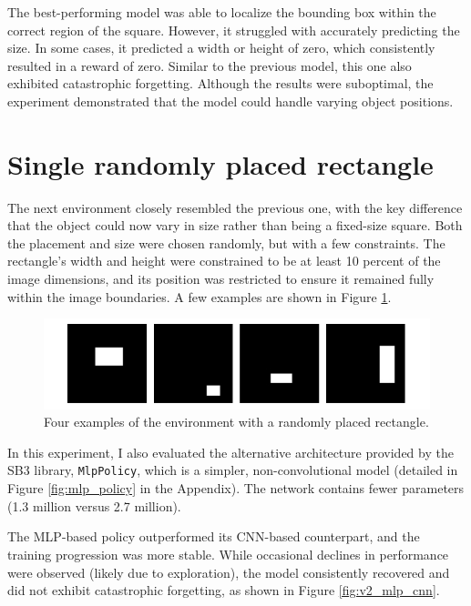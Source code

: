 \documentclass[
  digital,     %
  oneside,     %
  nosansbold,  %
  nocolorbold, %
  lof,         %
  lot,         %
]{fithesis4}
\begin{document}
The best-performing model was able to localize the bounding box within the correct region of the square. However, it struggled with accurately predicting the size. In some cases, it predicted a width or height of zero, which consistently resulted in a reward of zero. Similar to the previous model, this one also exhibited catastrophic forgetting. Although the results were suboptimal, the experiment demonstrated that the model could handle varying object positions.

\section{Single randomly placed rectangle}
\label{sec:moving_rectangle}
The next environment closely resembled the previous one, with the key difference that the object could now vary in size rather than being a fixed-size square. Both the placement and size were chosen randomly, but with a few constraints. The rectangle’s width and height were constrained to be at least 10 percent of the image dimensions, and its position was restricted to ensure it remained fully within the image boundaries. A few examples are shown in Figure \ref{fig:env2}.

\begin{figure}
    \includegraphics[width=1\linewidth]{env_examples/env2.pdf}
    \caption{Four examples of the environment with a randomly placed rectangle.}
    \label{fig:env2}
\end{figure}

In this experiment, I also evaluated the alternative architecture provided by the SB3 library, \texttt{MlpPolicy}, which is a simpler, non-convolutional model (detailed in Figure \ref{fig:mlp_policy} in the Appendix). The network contains fewer parameters (1.3 million versus 2.7 million).

The MLP-based policy outperformed its CNN-based counterpart, and the training progression was more stable. While occasional declines in performance were observed (likely due to exploration), the model consistently recovered and did not exhibit catastrophic forgetting, as shown in Figure \ref{fig:v2_mlp_cnn}.
\end{document}
